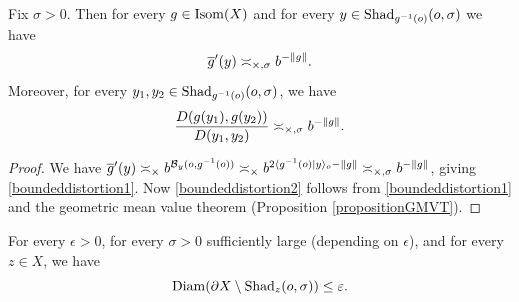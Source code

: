 \begin{lemma}
\label{lemmaboundeddistortion}
Fix $\sigma > 0$. Then for every $g\in\operatorname{Isom}(X)$ and for every $y\in\operatorname{Shad}_{g^{-1}(o)}(o,\sigma)$ we have
\begin{equation}
\label{boundeddistortion1}
\overline g'(y) \asymp_{\times,\sigma} b^{-\|g\|}.
\end{equation}
Moreover, for every $y_1,y_2\in \operatorname{Shad}_{g^{-1}(o)}(o,\sigma)$, we have
\begin{equation}
\label{boundeddistortion2}
\frac{D (g(y_1),g(y_2) )}{D(y_1,y_2)} \asymp_{\times,\sigma} b^{-\|g\|}.
\end{equation}
\end{lemma}
\begin{proof}
We have $\overline g'(y) \asymp_\times b^{\operatorname{\mathcal B}_y(o,g^{-1}(o))}
\asymp_\times b^{2\langle g^{-1}(o)|y\rangle_o - \|g\|}
\asymp_{\times,\sigma} b^{-\|g\|}$, giving \eqref{boundeddistortion1}.
Now \eqref{boundeddistortion2} follows from \eqref{boundeddistortion1} and the geometric mean value theorem (Proposition \ref{propositionGMVT}).
\end{proof}

\begin{lemma}
\label{lemmabigshadow}
For every $\epsilon > 0$, for every $\sigma > 0$ sufficiently large (depending on $\epsilon$), and for every $z\in X$, we have
\begin{equation}
\label{bigshadow}
\operatorname{Diam}(\partial X\setminus\operatorname{Shad}_z(o,\sigma)) \leq \varepsilon.
\end{equation}
\end{lemma}

